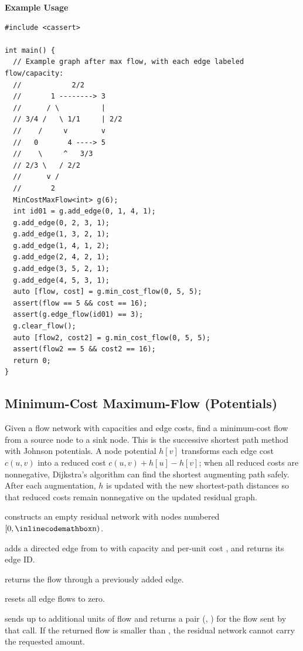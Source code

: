 \textbf{Example Usage}\par
\begin{lstlisting}[style=cpp]
#include <cassert>

int main() {
  // Example graph after max flow, with each edge labeled flow/capacity:
  //            2/2
  //       1 --------> 3
  //      / \          |
  // 3/4 /   \ 1/1     | 2/2
  //    /     v        v
  //   0       4 ----> 5
  //    \     ^   3/3
  // 2/3 \   / 2/2
  //      v /
  //       2
  MinCostMaxFlow<int> g(6);
  int id01 = g.add_edge(0, 1, 4, 1);
  g.add_edge(0, 2, 3, 1);
  g.add_edge(1, 3, 2, 1);
  g.add_edge(1, 4, 1, 2);
  g.add_edge(2, 4, 2, 1);
  g.add_edge(3, 5, 2, 1);
  g.add_edge(4, 5, 3, 1);
  auto [flow, cost] = g.min_cost_flow(0, 5, 5);
  assert(flow == 5 && cost == 16);
  assert(g.edge_flow(id01) == 3);
  g.clear_flow();
  auto [flow2, cost2] = g.min_cost_flow(0, 5, 5);
  assert(flow2 == 5 && cost2 == 16);
  return 0;
}
\end{lstlisting}
\subsection{Minimum-Cost Maximum-Flow (Potentials)}
\label{sec:4.5.7}
Given a flow network with capacities and edge costs, find a minimum-cost flow from a source node to a sink node. This is the successive shortest path method with Johnson potentials. A node potential $h[v]$ transforms each edge cost $c(u, v)$ into a reduced cost $c(u, v) + h[u] - h[v]$; when all reduced costs are nonnegative, Dijkstra's algorithm can find the shortest augmenting path safely. After each augmentation, $h$ is updated with the new shortest-path distances so that reduced costs remain nonnegative on the updated residual graph.

\begin{compactitem}
  \item {} constructs an empty residual network with nodes numbered $[0, {\inlinecodemath{n}})$.
  \item {} adds a directed edge from  to  with capacity  and per-unit cost , and returns its edge ID.
  \item {} returns the flow through a previously added edge.
  \item {} resets all edge flows to zero.
  \item {} sends up to  additional units of flow and returns a pair (, ) for the flow sent by that call. If the returned flow is smaller than , the residual network cannot carry the requested amount.
\end{compactitem}


